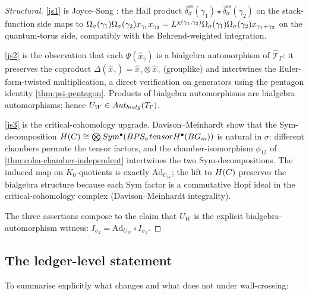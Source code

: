 \begin{proof}[Structural]
  \ref{js1} is Joyce--Song \cite[Thm 5.8]{JoyceSong2012}: the Hall product
  $\bar{\delta}_\sigma^{\mathrm{ss}}(\gamma_1) \star \bar{\delta}_\sigma^{\mathrm{ss}}(\gamma_2)$
  on the stack-function side maps to
  $\Omega_\sigma(\gamma_1) \Omega_\sigma(\gamma_2) x_{\gamma_1} x_{\gamma_2}
  = L^{\chi(\gamma_1, \gamma_2)} \Omega_\sigma(\gamma_1) \Omega_\sigma(\gamma_2) x_{\gamma_1 + \gamma_2}$
  on the quantum-torus side, compatibly with the Behrend-weighted integration.

  \ref{js2} is the observation that each $\Psi(\hat{x}_\gamma)$ is a bialgebra
  automorphism of $\hat{\mathcal{T}}_\Gamma$: it preserves the coproduct
  $\Delta(\hat{x}_\gamma) = \hat{x}_\gamma \otimes \hat{x}_\gamma$ (grouplike) and
  intertwines the Euler-form-twisted multiplication, a direct
  verification on generators using the pentagon identity
  \cref{thm:psi-pentagon}. Products of bialgebra automorphisms are
  bialgebra automorphisms; hence $U_W \in Aut_{bialg}(T_\Gamma)$.

  \ref{js3} is the critical-cohomology upgrade. Davison--Meinhardt
  \cite{DavisonMeinhardt2020} show that the Sym-decomposition
  $H(C) \cong \bigotimes Sym^\bullet(BPS_\sigma tensor H^\bullet(BG_m))$
  is natural in $\sigma$: different chambers permute the tensor factors,
  and the chamber-isomorphism $\phi_{12}$ of
  \cref{thm:coha-chamber-independent} intertwines the two
  Sym-decompositions. The induced map on $K_0$-quotients is exactly
  $\mathrm{Ad}_{U_W}$; the lift to $H(C)$ preserves the bialgebra
  structure because each Sym factor is a commutative Hopf ideal in the
  critical-cohomology complex (Davison--Meinhardt integrality).

  The three assertions compose to the claim that $U_W$ is the explicit
  bialgebra-automorphism witness: $I_{\sigma_2} = \mathrm{Ad}_{U_W} \circ I_{\sigma_1}$.
\end{proof}

\subsection{The ledger-level statement}

To summarise explicitly what changes and what does not under wall-crossing:

